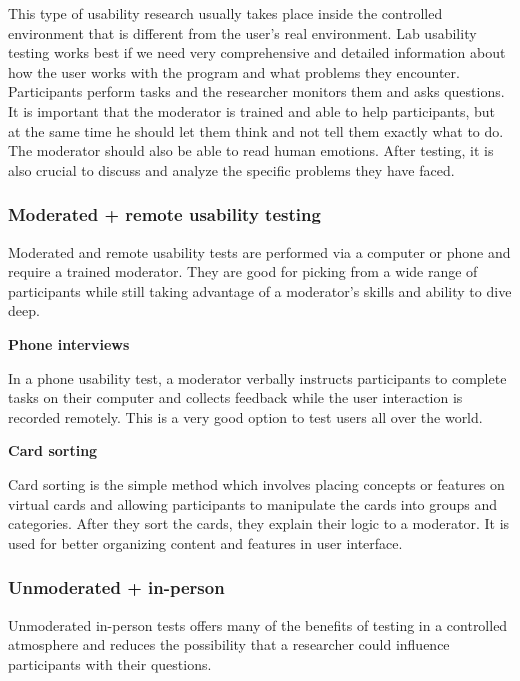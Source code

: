 \documentclass[a4paper,10pt,twoside]{article}
\begin{document}
\noindent This type of usability research usually takes place inside the controlled environment that is different from the user’s real environment. 
Lab usability testing works best if we need very comprehensive and detailed information about how the user works with the program and what problems they encounter. Participants perform tasks and the researcher monitors them and asks questions. It is important that the moderator is trained and able to help participants, but at the same time he should let them think and not tell them exactly what to do. The moderator should also be able to read human emotions. After testing, it is also crucial to discuss and analyze the specific problems they have faced.

\subsubsection{Moderated + remote usability testing}
Moderated and remote usability tests are performed via a computer or phone and require a trained moderator. They are good for picking from a wide range of participants while still taking advantage of a moderator's skills and ability to dive deep.

\smallskip

\noindent \textbf {Phone interviews}

\noindent In a phone usability test, a moderator verbally instructs participants to complete tasks on their computer and collects feedback while the user interaction is recorded remotely. This is a very good option to test users all over the world. 

\smallskip

\noindent \textbf {Card sorting}

\noindent Card sorting is the simple method which involves placing concepts or features on virtual cards and allowing participants to manipulate the cards into groups and categories. After they sort the cards, they explain their logic to a moderator. It is used for better organizing content and features in user interface.

\subsubsection {Unmoderated + in-person}
Unmoderated in-person tests offers many of the benefits of testing in a controlled atmosphere and reduces the possibility that a researcher could influence participants with their questions.

\smallskip
\end{document}
